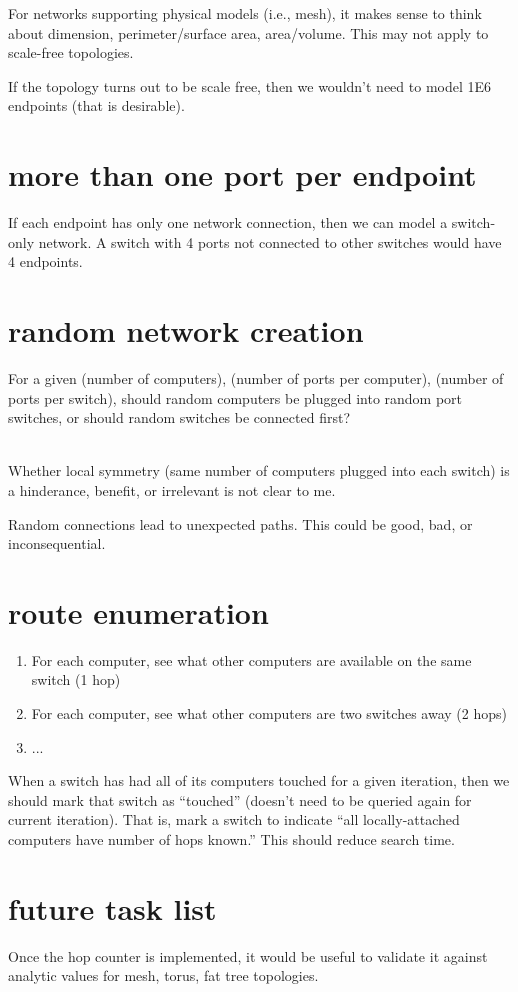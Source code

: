 \documentclass[pdftex]{article}
\begin{document}
For networks supporting physical models (i.e., mesh), it makes sense to think about dimension, perimeter/surface area, area/volume. This may not apply to scale-free topologies. 

If the topology turns out to be scale free, then we wouldn't need to model 1E6 endpoints (that is desirable).

\section{more than one port per endpoint}

If each endpoint has only one network connection, then we can model a switch-only network. A switch with 4 ports not connected to other switches would have 4 endpoints.

\section{random network creation}

For a given {(number of computers), (number of ports per computer), (number of ports per switch)}, should random computers be plugged into random port switches, or should random switches be connected first?

\ \\
Whether local symmetry (same number of computers plugged into each switch) is a hinderance, benefit, or irrelevant is not clear to me.

Random connections lead to unexpected paths. This could be good, bad, or inconsequential.

\section{route enumeration}

\begin{enumerate}
 \item For each computer, see what other computers are available on the same switch (1 hop)
 \item For each computer, see what other computers are two switches away (2 hops)
 \item ...
\end{enumerate}
When a switch has had all of its computers touched for a given iteration, then we should mark that switch as ``touched'' (doesn't need to be queried again for current iteration). That is, mark a switch to indicate ``all locally-attached computers have number of hops known.'' This should reduce search time.

\section{future task list}

Once the hop counter is implemented, it would be useful to validate it against analytic values for mesh, torus, fat tree topologies.
\end{document}
